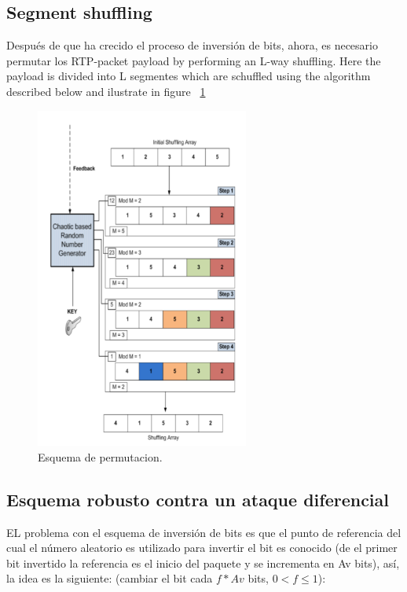 \subsection{Segment shuffling}

Después de que ha crecido el  proceso de inversión de bits, ahora, es necesario permutar los RTP-packet payload by performing an L-way shuffling. Here the payload is divided into L segmentes which are schuffled using the algorithm described below and ilustrate in figure ~\ref{shuffling}

\begin{figure}[H]
\centering
\includegraphics[width=7cm]{logos/per.png}
\caption{Esquema de permutacion.}
\label{shuffling}
\end{figure}


\subsection{Esquema robusto contra un ataque diferencial}

EL problema con el esquema de inversión de bits es que el punto de referencia del cual el número aleatorio es utilizado para invertir el bit es conocido (de el primer bit invertido la referencia es el inicio del paquete y se incrementa en Av bits), así, la idea es la siguiente: (cambiar el bit cada  $f*Av$ bits, $0 < f \leq 1$):

